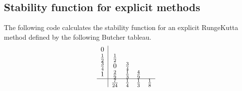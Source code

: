 \documentclass[letterpaper,10pt,english]{jupyterBook}
\begin{document}
\subsection{Stability function for explicit methods}
\label{\detokenize{8_Appendices/8.1_Python:stability-function-for-explicit-methods}}
\sphinxAtStartPar
The following code calculates the stability function for an explicit Runge\sphinxhyphen{}Kutta method defined by the following Butcher tableau.
\begin{align*}\begin{array}{c|cccc}
0 &  &  &  & \\
\frac{1}{2} & \frac{1}{2} &  &  & \\
\frac{3}{4} & 0 & \frac{3}{4} &  & \\
1 & \frac{2}{9} & \frac{1}{3} & \frac{4}{9} & \\ 
\hline
& \frac{7}{24} & \frac{1}{4} & \frac{1}{3} & \frac{1}{8}
\end{array}\end{align*}
\end{document}
